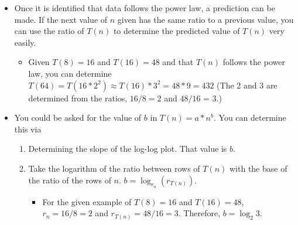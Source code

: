 \documentclass{article}
\begin{document}
\begin{itemize}
        \begin{center}
        \end{center}

    \item
        Once it is identified that data follows the power law, a prediction can be made. If the next value of $n$ given has the same ratio to a previous value, you can use the ratio of $T(n)$ to determine the predicted value of $T(n)$ very easily. 
        \begin{itemize}
            \item Given $T(8) = 16$ and $T(16) = 48$ and that $T(n)$ follows the power law, you can determine $T(64) = T(16 * 2^2) \approx T(16) * 3^2 = 48 * 9 = 432$ (The 2 and 3 are determined from the ratios, $16/8 = 2$ and $48/16$ = 3.)
        \end{itemize}
    \item
        You could be asked for the value of $b$ in $T(n) = a * n^b$. You can determine this via 
        \begin{enumerate}
            \item Determining the slope of the log-log plot. That value is $b$. 
            \item Take the logarithm of the ratio between rows of $T(n)$ with the base of the ratio of the rows of $n$. $b = \log_{r_n} (r_{T(n)})$.
                \begin{itemize}
                    \item For the given example of $T(8) = 16$ and $T(16) = 48$, $r_n = 16 / 8 = 2$ and $r_{T(n)} = 48 / 16 = 3$. Therefore, $b = \log_2 3$.
                \end{itemize}
        \end{enumerate}

\end{itemize}
\end{document}
